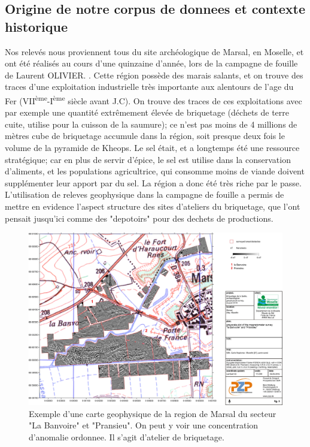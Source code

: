 \documentclass[a4paper, 12pt, titlepage, oneside, french]{article}
\begin{document}
	\subsection{Origine de notre corpus de donnees et contexte historique}

	Nos relevés nous proviennent tous du site archéologique de Marsal, en Moselle, et ont été réalisés au cours d'une quinzaine d'année, lors de la campagne de fouille de Laurent OLIVIER.%
	. Cette région possède des marais salants, et on trouve des traces d'une exploitation industrielle très importante aux alentours de l'age du Fer (VII\textsuperscript{ème}-I\textsuperscript{ème} siècle avant J.C). On trouve des traces de ces exploitations avec par exemple une quantité extrêmement élevée de briquetage (déchets de terre cuite, utilise pour la cuisson de la saumure); ce n'est pas moins de 4 millions de mètres cube de briquetage accumule dans la région, soit presque deux fois le volume de la pyramide de Kheops. Le sel était, et a longtemps été une ressource stratégique; car en plus de servir d'épice, le sel est utilise dans la conservation d'aliments, et les populations agricultrice, qui consomme moins de viande doivent supplémenter leur apport par du sel. La région a donc été très riche par le passe. 
	L'utilisation de releves geophysique dans la campagne de fouille a permis de mettre en evidence l'aspect structure des sites d'ateliers du briquetage, que l'ont pensait jusqu'ici comme des "depotoirs" pour des dechets de productions.  

\begin{figure}[H]
	\centering
		\includegraphics[width =\textwidth]{ExempleMap.jpg}
		\caption{Exemple d'une carte geophysique de la region de Marsal du secteur "La Banvoire" et "Pransieu". On peut y voir une concentration d'anomalie ordonnee. Il s'agit d'atelier de briquetage.}
		\label{fig:ExempleMap}
\end{figure}
\end{document}
